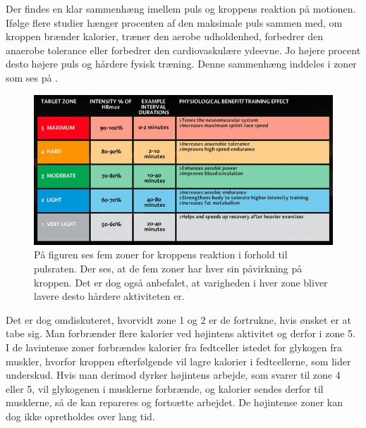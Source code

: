 Der findes en klar sammenhæng imellem puls og kroppens reaktion på motionen. Ifølge flere studier hænger procenten af den maksimale puls sammen med, om kroppen brænder kalorier, træner den aerobe udholdenhed, forbedrer den anaerobe tolerance eller forbedrer den cardiovaskulære ydeevne. Jo højere procent desto højere puls og hårdere fysisk træning. Denne sammenhæng inddeles i zoner som ses på .\citep{Leyland2007,Heartratejournal2015}
\begin{figure}[H]
	\centering
	\includegraphics[scale=0.75]{figures/aProblemanalyse/heart-rate-zones.jpg}
	\caption{På figuren ses fem zoner for kroppens reaktion i forhold til pulsraten. Der ses, at de fem zoner har hver sin påvirkning på kroppen. Det er dog også anbefalet, at varigheden i hver zone bliver lavere desto hårdere aktiviteten er.\citep{Heartratejournal2015}}
	\label{fig:PA_Procentpuls}
\end{figure}
Det er dog omdiskuteret, hvorvidt zone 1 og 2 er de fortrukne, hvis ønsket er at tabe sig. Man forbrænder flere kalorier ved højintens aktivitet og derfor i zone 5. I de lavintense zoner forbrændes kalorier fra fedtceller istedet for glykogen fra muskler, hvorfor kroppen efterfølgende vil lagre kalorier i fedtcellerne, som lider underskud. Hvis man derimod dyrker højintens arbejde, som svarer til zone 4 eller 5, vil glykogenen i musklerne forbrænde, og kalorier sendes derfor til musklerne, så de kan repareres og fortsætte arbejdet. De højintense zoner kan dog ikke opretholdes over lang tid.

